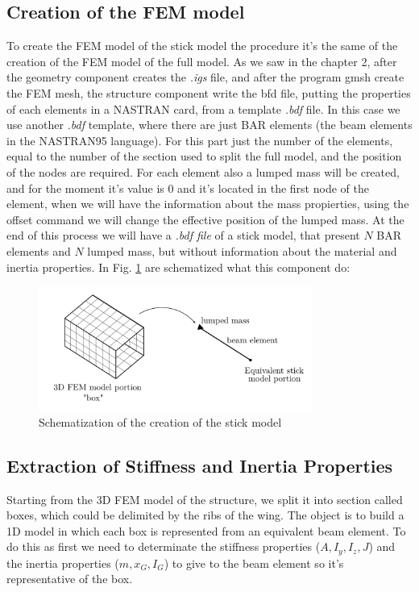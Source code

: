 \subsection{Creation of the FEM model}
To create the FEM model of the stick model the procedure it's the same of the creation of the FEM model of the full model. As we saw in the chapter 2, after the geometry component creates the \textit{.igs} file, and after the program gmsh create the FEM mesh, the structure component write the bfd file, putting the properties of each elements in a NASTRAN card, from a template \textit{.bdf} file. In this case we use another \textit{.bdf} template, where there are just BAR elements (the beam elements in the NASTRAN95 language). For this part just the number of the elements, equal to the number of the section used to split the full model, and the position of the nodes are required. For each element also a lumped mass will be created, and for the moment it's value is 0 and it's located in the first node of the element, when we will have the information about the mass propierties, using the offset command we will change the effective position of the lumped mass. At the end of this process we will have a \textit{.bdf file} of a stick model, that present $N$ BAR elements and $N$ lumped mass, but without information about the material and inertia properties. In Fig. \ref{fig:4_3} are schematized what this component do:
\begin{figure}[H]
	\centering
	\includegraphics[width = 0.8\textwidth]{./Immagini/4_3.png}
	\caption{Schematization of the creation of the stick model }
	\label{fig:4_3}
\end{figure}
\subsection{Extraction of Stiffness and Inertia Properties}
Starting from the 3D FEM model of the structure, we split it into section called boxes, which could be delimited by the ribs of the wing. The object is to build a 1D model in which each box is represented from an equivalent beam element. To do this as first we need to determinate the stiffness properties ($A,I_y,I_z,J$) and the inertia properties ($m,x_G,I_G$) to give to the beam element so it's representative of the box. 
